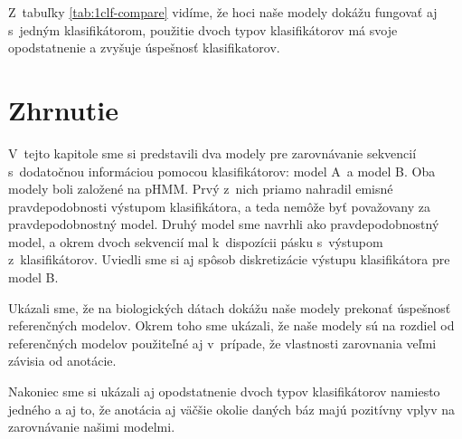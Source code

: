 Z~tabuľky \ref{tab:1clf-compare} vidíme, že hoci naše modely dokážu fungovať aj s~jedným klasifikátorom, použitie dvoch typov klasifikátorov má svoje opodstatnenie a zvyšuje úspešnosť klasifikatorov.

\section{Zhrnutie}

V~tejto kapitole sme si predstavili dva modely pre zarovnávanie sekvencií s~dodatočnou informáciou pomocou klasifikátorov: model A~a model B.
Oba modely boli založené na pHMM. Prvý z~nich priamo nahradil emisné pravdepodobnosti výstupom klasifikátora, a teda nemôže byť považovany za pravdepodobnostný model.
Druhý model sme navrhli ako pravdepodobnostný model, a okrem dvoch sekvencií mal k~dispozícii pásku s~výstupom z~klasifikátorov. Uviedli sme si aj spôsob diskretizácie výstupu klasifikátora pre model B.

Ukázali sme, že na biologických dátach dokážu naše modely prekonať úspešnosť referenčných modelov. Okrem toho sme ukázali, že naše modely sú na rozdiel od referenčných modelov použiteľné aj v~prípade, že vlastnosti zarovnania veľmi závisia od anotácie.

Nakoniec sme si ukázali aj opodstatnenie dvoch typov klasifikátorov namiesto jedného a aj to, že anotácia aj väčšie okolie daných báz majú pozitívny vplyv na zarovnávanie našimi modelmi.
